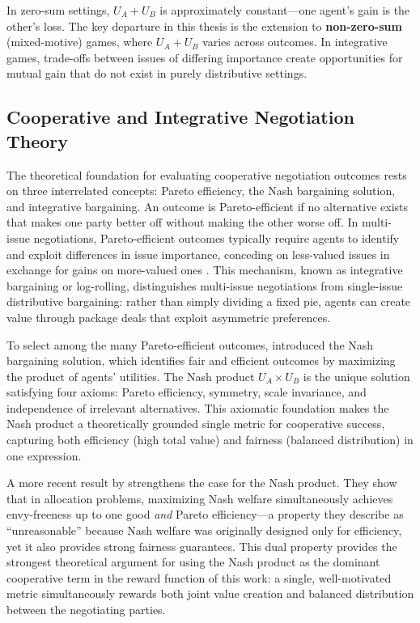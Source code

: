 \documentclass[12pt,a4paper]{article}
\begin{document}
In zero-sum settings, $U_A + U_B$ is approximately constant---one agent's gain is the other's loss. The key departure in this thesis is the extension to \textbf{non-zero-sum} (mixed-motive) games, where $U_A + U_B$ varies across outcomes. In integrative games, trade-offs between issues of differing importance create opportunities for mutual gain that do not exist in purely distributive settings.

\subsection{Cooperative and Integrative Negotiation Theory}\label{sec:cooperative_negotiation_theory}

The theoretical foundation for evaluating cooperative negotiation outcomes rests on three interrelated concepts: Pareto efficiency, the Nash bargaining solution, and integrative bargaining. An outcome is Pareto-efficient if no alternative exists that makes one party better off without making the other worse off. In multi-issue negotiations, Pareto-efficient outcomes typically require agents to identify and exploit differences in issue importance, conceding on less-valued issues in exchange for gains on more-valued ones \citep{lax1992manager_summary}. This mechanism, known as integrative bargaining or log-rolling, distinguishes multi-issue negotiations from single-issue distributive bargaining: rather than simply dividing a fixed pie, agents can create value through package deals that exploit asymmetric preferences.

To select among the many Pareto-efficient outcomes, \citet{Nash1950THEBP} introduced the Nash bargaining solution, which identifies fair and efficient outcomes by maximizing the product of agents' utilities. The Nash product $U_A \times U_B$ is the unique solution satisfying four axioms: Pareto efficiency, symmetry, scale invariance, and independence of irrelevant alternatives. This axiomatic foundation makes the Nash product a theoretically grounded single metric for cooperative success, capturing both efficiency (high total value) and fairness (balanced distribution) in one expression.

A more recent result by \citet{caragiannis2019unreasonable} strengthens the case for the Nash product. They show that in allocation problems, maximizing Nash welfare simultaneously achieves envy-freeness up to one good \emph{and} Pareto efficiency---a property they describe as ``unreasonable'' because Nash welfare was originally designed only for efficiency, yet it also provides strong fairness guarantees. This dual property provides the strongest theoretical argument for using the Nash product as the dominant cooperative term in the reward function of this work: a single, well-motivated metric simultaneously rewards both joint value creation and balanced distribution between the negotiating parties.
\end{document}

